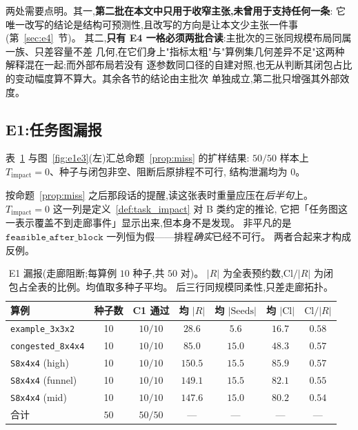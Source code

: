 \documentclass[manuscript,screen,review]{acmart}
\newcommand{\NSeeds}{10}
\newcommand{\NPairs}{50}
\newcommand{\PassMiss}{\NPairs/\NPairs}      %
\begin{document}
两处需要点明。其一,\textbf{第二批在本文中只用于收窄主张,未曾用于支持任何一条}:
它唯一改写的结论是结构可预测性,且改写的方向是让本文少主张一件事(第~\ref{sec:e4}~节)。
其二,\textbf{只有 E4 一格必须两批合读}:主批次的三张同规模布局同属一族、只差容量不差
几何,在它们身上"指标太粗"与"算例集几何差异不足"这两种解释混在一起;而外部布局若没有
逐参数同口径的自建对照,也无从判断其闭包占比的变动幅度算不算大。其余各节的结论由主批次
单独成立,第二批只增强其外部效度。

\subsection{E1:任务图漏报}
\label{sec:e1}

表~\ref{tab:e1} 与图~\ref{fig:e1e3}(左)汇总命题~\ref{prop:miss} 的扩样结果:
\(\PassMiss\) 样本上 \(T_{\mathrm{impact}}=0\)、种子与闭包非空、阻断后原排程不可行,
结构泄漏均为 \(0\)。

按命题~\ref{prop:miss} 之后那段话的提醒,读这张表时重量应压在\emph{后半句}上。
\(T_{\mathrm{impact}}=0\) 这一列是定义~\ref{def:task_impact} 对 B 类约定的推论,
它把「任务图这一表示覆盖不到走廊事件」显示出来,但本身不是发现。
非平凡的是\(\texttt{feasible\_after\_block}\) 一列恒为假——排程\emph{确实}已经不可行。
两者合起来才构成反例。

\begin{table}[t]
\centering
\caption{E1 漏报(走廊阻断;每算例 \(\NSeeds\) 种子,共 \(\NPairs\) 对)。
\(|R|\) 为全表预约数,\(\mathrm{Cl}/|R|\) 为闭包占全表的比例。均值取多种子平均。
后三行同规模同柔性,只差走廊拓扑。}
\label{tab:e1}
\small
\begin{tabular}{@{}lcccccc@{}}
\toprule
算例 & 种子数 & C1 通过 & 均 \(|R|\) & 均 \(|\mathrm{Seeds}|\)
 & 均 \(|\mathrm{Cl}|\) & \(\mathrm{Cl}/|R|\) \\
\midrule
\texttt{example\_3x3x2}   & 10 & \(10/10\) & \(28.6\)  & \(5.6\)  & \(16.7\) & \(0.58\) \\
\texttt{congested\_8x4x4} & 10 & \(10/10\) & \(85.0\)  & \(15.0\) & \(48.3\) & \(0.57\) \\
\texttt{S8x4x4} (high)    & 10 & \(10/10\) & \(150.5\) & \(15.5\) & \(85.9\) & \(0.57\) \\
\texttt{S8x4x4} (funnel)  & 10 & \(10/10\) & \(149.1\) & \(15.5\) & \(82.1\) & \(0.55\) \\
\texttt{S8x4x4} (mid)     & 10 & \(10/10\) & \(147.6\) & \(15.0\) & \(80.2\) & \(0.54\) \\
\midrule
合计 & \(\NPairs\) & \(\PassMiss\) & --- & --- & --- & --- \\
\bottomrule
\end{tabular}
\end{table}
\end{document}
